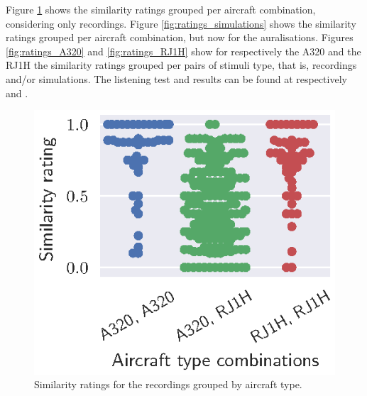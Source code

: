 
Figure \ref{fig:ratings_recordings} shows the similarity ratings grouped per
aircraft combination, considering only recordings. Figure
\ref{fig:ratings_simulations} shows the similarity ratings grouped per
aircraft combination, but now for the auralisations.
Figures \ref{fig:ratings_A320} and \ref{fig:ratings_RJ1H} show
for respectively the A320 and the RJ1H the similarity ratings grouped per pairs
of stimuli type, that is, recordings and/or simulations.
The listening test and results can be found at respectively \cite{Rietdijk2017a} and \cite{Rietdijk2017b}.



\begin{figure}[H]
  \centering
  \includegraphics[]{../figures/manual/auralisation-paper/figure1_ratings_recordings}
  \caption{Similarity ratings for the recordings grouped by aircraft type.}
  \label{fig:ratings_recordings}
\end{figure}

